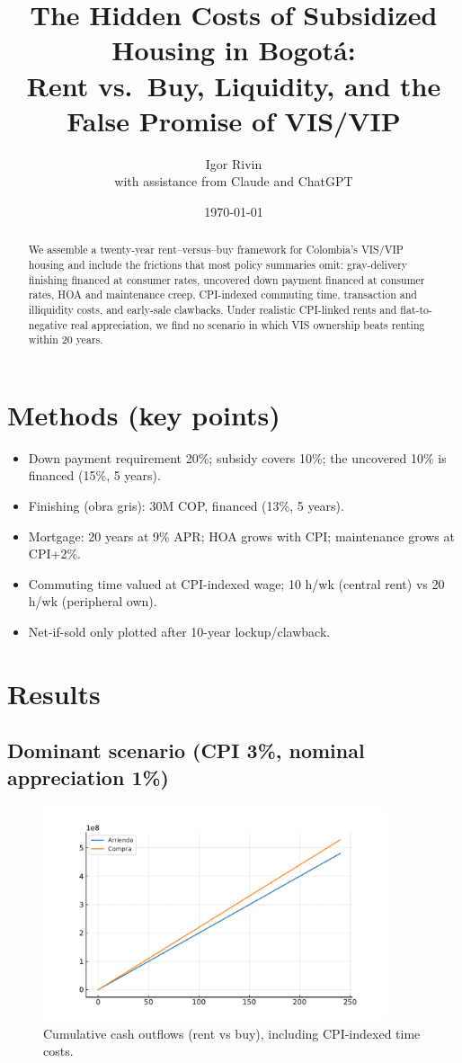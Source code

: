 \documentclass[12pt]{article}
\title{The Hidden Costs of Subsidized Housing in Bogotá:\\
Rent vs.\ Buy, Liquidity, and the False Promise of VIS/VIP}
\author{Igor Rivin\\
\small{with assistance from Claude and ChatGPT}}
\date{\today}
\begin{document}
\maketitle

\begin{abstract}
We assemble a twenty-year rent--versus--buy framework for Colombia's VIS/VIP housing and include the frictions that most policy summaries omit: gray-delivery finishing financed at consumer rates, uncovered down payment financed at consumer rates, HOA and maintenance creep, CPI-indexed commuting time, transaction and illiquidity costs, and early-sale clawbacks. Under realistic CPI-linked rents and flat-to-negative real appreciation, we find no scenario in which VIS ownership beats renting within 20 years.
\end{abstract}

\section*{Methods (key points)}
\begin{itemize}
  \item Down payment requirement 20\%; subsidy covers 10\%; the uncovered 10\% is financed (15\%, 5 years).
  \item Finishing (obra gris): 30M COP, financed (13\%, 5 years).
  \item Mortgage: 20 years at 9\% APR; HOA grows with CPI; maintenance grows at CPI+2\%.
  \item Commuting time valued at CPI-indexed wage; 10 h/wk (central rent) vs 20 h/wk (peripheral own).
  \item Net-if-sold only plotted after 10-year lockup/clawback.
\end{itemize}

\section*{Results}
\subsection*{Dominant scenario (CPI 3\%, nominal appreciation 1\%)}
\begin{figure}[h]
\centering
\includegraphics[width=0.9\textwidth]{cash_outflows_dominant.pdf}
\caption{Cumulative cash outflows (rent vs buy), including CPI-indexed time costs.}
\end{figure}
\end{document}
